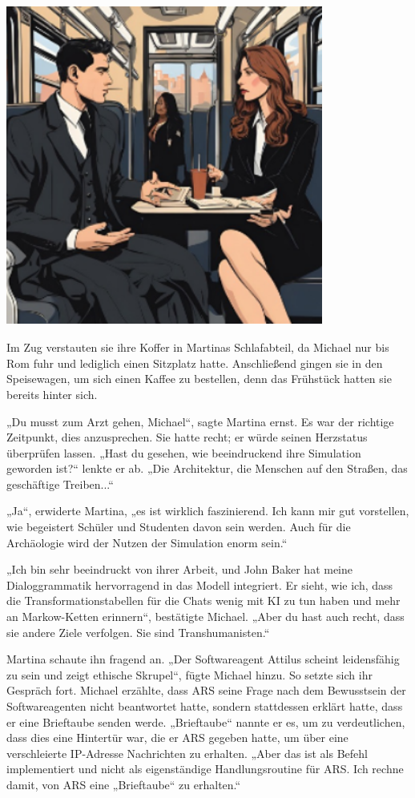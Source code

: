 \documentclass[
]{article}
\begin{document}
\includegraphics[width=4.10876in,height=4.16184in]{media/image3.png}

Im Zug verstauten sie ihre Koffer in Martinas Schlafabteil, da Michael
nur bis Rom fuhr und lediglich einen Sitzplatz hatte. Anschließend
gingen sie in den Speisewagen, um sich einen Kaffee zu bestellen, denn
das Frühstück hatten sie bereits hinter sich.

„Du musst zum Arzt gehen, Michael``, sagte Martina ernst. Es war der
richtige Zeitpunkt, dies anzusprechen. Sie hatte recht; er würde seinen
Herzstatus überprüfen lassen. „Hast du gesehen, wie beeindruckend ihre
Simulation geworden ist?{\kern0pt}`` lenkte er ab. „Die Architektur, die
Menschen auf den Straßen, das geschäftige Treiben...``

„Ja``, erwiderte Martina, „es ist wirklich faszinierend. Ich kann mir
gut vorstellen, wie begeistert Schüler und Studenten davon sein werden.
Auch für die Archäologie wird der Nutzen der Simulation enorm sein.``

„Ich bin sehr beeindruckt von ihrer Arbeit, und John Baker hat meine
Dialoggrammatik hervorragend in das Modell integriert. Er sieht, wie
ich, dass die Transformationstabellen für die Chats wenig mit KI zu tun
haben und mehr an Markow-Ketten erinnern``, bestätigte Michael. „Aber du
hast auch recht, dass sie andere Ziele verfolgen. Sie sind
Transhumanisten.``

Martina schaute ihn fragend an. „Der Softwareagent Attilus scheint
leidensfähig zu sein und zeigt ethische Skrupel``, fügte Michael hinzu.
So setzte sich ihr Gespräch fort. Michael erzählte, dass ARS seine Frage
nach dem Bewusstsein der Softwareagenten nicht beantwortet hatte,
sondern stattdessen erklärt hatte, dass er eine Brieftaube senden werde.
„Brieftaube`` nannte er es, um zu verdeutlichen, dass dies eine
Hintertür war, die er ARS gegeben hatte, um über eine verschleierte
IP-Adresse Nachrichten zu erhalten. „Aber das ist als Befehl
implementiert und nicht als eigenständige Handlungsroutine für ARS. Ich
rechne damit, von ARS eine „Brieftaube`` zu erhalten.``
\end{document}
